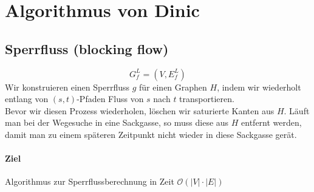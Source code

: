 \section{Algorithmus von Dinic}
\subsection{Sperrfluss (blocking flow)}
\[ G^L_f=(V,E^L_f) \]
Wir konstruieren einen Sperrfluss $g$ für einen Graphen $H$, indem wir wiederholt entlang von $(s,t)$-Pfaden Fluss von $s$ nach $t$ transportieren.\\
Bevor wir diesen Prozess wiederholen, löschen wir saturierte Kanten aus $H$. Läuft man bei der Wegesuche in eine Sackgasse, so muss diese aus $H$ entfernt werden, damit man zu einem späteren Zeitpunkt nicht wieder in diese Sackgasse gerät.
\paragraph{Ziel}
Algorithmus zur Sperrflussberechnung in Zeit $\mathcal{O}(|V|\cdot|E|)$
